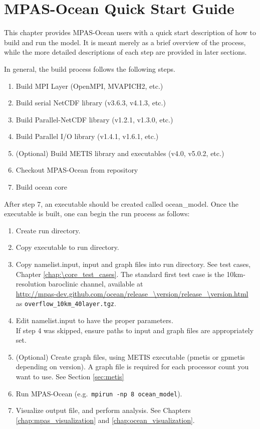 \chapter{MPAS-Ocean Quick Start Guide}
\label{chap:quick_start}

This chapter provides MPAS-Ocean users with a quick start description of how to
build and run the model. It is meant merely as a brief overview of the process,
while the more detailed descriptions of each step are provided in later
sections.

In general, the build process follows the following steps.

\begin{enumerate}
	\item Build MPI Layer (OpenMPI, MVAPICH2, etc.)
	\item Build serial NetCDF library (v3.6.3, v4.1.3, etc.)
	\item Build Parallel-NetCDF library (v1.2.1, v1.3.0, etc.)
	\item Build Parallel I/O library (v1.4.1, v1.6.1, etc.)
	\item (Optional) Build METIS library and executables (v4.0, v5.0.2, etc.)
	\item Checkout MPAS-Ocean from repository
	\item Build ocean core
\end{enumerate}

After step 7, an executable should be created called ocean\_model. Once the executable is built, one can begin the run process as follows:

\begin{enumerate}
	\item Create run directory.
	\item Copy executable to run directory.
	\item Copy namelist.input, input and graph files into run directory.  See test cases, Chapter \ref{chap:\core_test_cases}.  The standard first test case is the 10km-resolution baroclinic channel, available at\\
 \url{http://mpas-dev.github.com/ocean/release_\version/release_\version.html} \\
as {\tt overflow\_10km\_40layer.tgz}.
	\item Edit namelist.input to have the proper parameters. \\
		  If step 4 was skipped, ensure paths to input and graph files are appropriately set.
	\item (Optional) Create graph files, using METIS executable (pmetis or gpmetis depending on version).  A graph file is required for each processor count you want to use.  See Section \ref{sec:metis}
	\item Run MPAS-Ocean (e.g.\ {\tt mpirun -np 8 ocean\_model}).
	\item Visualize output file, and perform analysis.  See Chapters \ref{chap:mpas_visualization} and \ref{chap:ocean_visualization}.
\end{enumerate}
